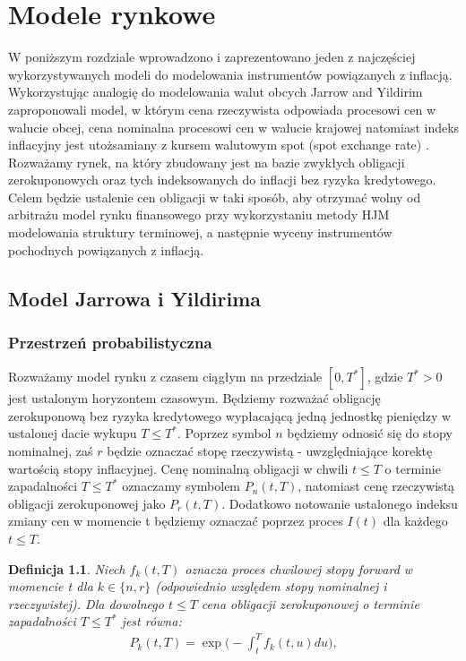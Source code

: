 \documentclass{mini}
\theoremstyle{mythstyle}
\newtheorem{Definicja}{Definicja}[chapter]
\begin{document}
	
	
\chapter{Modele rynkowe}

	W poniższym rozdziale wprowadzono i zaprezentowano jeden z najczęściej wykorzystywanych modeli do modelowania instrumentów powiązanych z inflacją. Wykorzystując analogię do modelowania walut obcych Jarrow and Yildirim zaproponowali model, w którym cena rzeczywista odpowiada procesowi cen w walucie obcej, cena nominalna procesowi cen w walucie krajowej natomiast indeks inflacyjny jest utożsamiany z kursem walutowym spot (spot exchange rate) . Rozważamy rynek, na który zbudowany jest na bazie zwykłych obligacji zerokuponowych oraz tych indeksowanych do inflacji bez ryzyka kredytowego. Celem będzie ustalenie cen obligacji w taki sposób, aby otrzymać wolny od arbitrażu model rynku finansowego przy wykorzystaniu metody HJM modelowania struktury terminowej, a następnie wyceny instrumentów pochodnych powiązanych z inflacją.
	
	\section{Model Jarrowa i Yildirima}
	
	\subsection*{Przestrzeń probabilistyczna}
		
	Rozważamy model rynku z czasem ciągłym na przedziale $[0,T^*]$, gdzie $T^* > 0$ jest ustalonym horyzontem czasowym. Będziemy rozważać obligację zerokuponową bez ryzyka kredytowego wypłacającą jedną jednostkę pieniędzy w ustalonej dacie wykupu $T \le T^*$. Poprzez symbol $n$ będziemy odnosić się do stopy nominalnej, zaś $r$ będzie oznaczać stopę rzeczywistą  - uwzględniające korektę wartością stopy inflacyjnej. Cenę nominalną obligacji w chwili $t \le T$ o terminie zapadalności $T \le T^*$  oznaczamy symbolem $P_n (t,T)$, natomiast cenę rzeczywistą obligacji zerokuponowej jako $P_r (t,T)$. Dodatkowo notowanie ustalonego indeksu zmiany cen w momencie t będziemy oznaczać poprzez proces $I(t)$ dla każdego $t \le T$.\\
	\begin{Definicja}
		Niech $f_k(t,T)$ oznacza proces chwilowej stopy forward w momencie t dla $k \in \{n,r\}$ (odpowiednio względem stopy nominalnej i rzeczywistej). Dla dowolnego  $t \le T$ cena obligacji zerokuponowej o terminie zapadalności $T \le T^*$ jest równa:
		\begin{eqnarray*}
			P_k(t,T) = \exp \bigg(-\int_t^T f_k(t,u) du \bigg),
		\end{eqnarray*}
	\end{Definicja}
	
\end{document}
